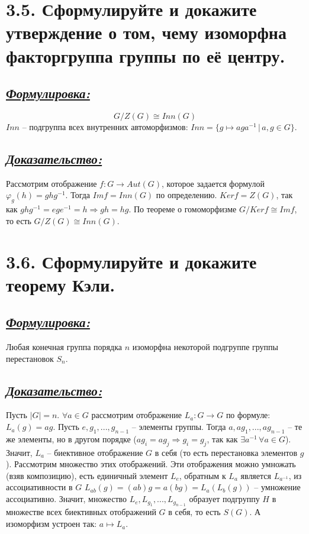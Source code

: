 \documentclass{article}
\begin{document}
\section*{\LARGE 3.5. Сформулируйте и докажите утверждение о том, чему изоморфна факторгруппа группы по её центру. }
\subsection*{\Large \underline{\textit{Формулировка: }}}
$$G/Z(G) \cong Inn(G)$$
$Inn$ -- подгруппа всех внутренних автоморфизмов: $Inn = \{g \mapsto aga^{-1}\,|\, a,g \in G\}$.

\subsection*{\Large \underline{\textit{Доказательство:}}}
Рассмотрим отображение $f : G \rightarrow Aut(G)$, которое задается формулой 
\newline $\varphi_g(h) = ghg^{-1}$. Тогда $Imf = Inn(G)$ по определению. $Kerf = Z(G)$, так как $ghg^{-1} = ege^{-1} = h \Rightarrow gh = hg$. По теореме о гомоморфизме $G / Kerf \cong Imf$, то есть $G / Z(G) \cong Inn(G)$. 

\section*{\LARGE 3.6. Сформулируйте и докажите теорему Кэли. }
\subsection*{\Large \underline{\textit{Формулировка: }}}
Любая конечная группа порядка $n$ изоморфна некоторой подгруппе группы перестановок $S_n$.

\subsection*{\Large \underline{\textit{Доказательство: }}}
Пусть $|G| = n$. $\forall a \in G$ рассмотрим отображение $L_a : G \rightarrow G$ по формуле: $L_a(g) = ag$.
\newline Пусть $e, g_1, ..., g_{n-1}$ -- элементы группы. Тогда $a, ag_1, ..., ag_{n - 1}$ -- те же элементы, но в другом порядке ($ag_i = ag_j \Rightarrow g_i = g_j$, так как $\exists a^{-1}\,\forall a \in G$). Значит, $L_a$ -- биективное отображение $G$ в себя (то есть перестановка элементов $g$). Рассмотрим множество этих отображений. Эти отображения можно умножать (взяв композицию), есть единичный элемент $L_e$, обратным к $L_a$ является $L_{a^{-1}}$, из ассоциативности в $G$ $L_{ab}(g) = (ab)g = a(bg) = L_a(L_b(g))$ -- умножение ассоциативно. Значит, множество $L_e, L_{g_1}, ..., L_{g_{n-1}}$ образует подгруппу $H$ в множестве всех биективных отображений $G$ в себя, то есть $S(G)$. А изоморфизм устроен так: $a \mapsto L_a$.
\end{document}
